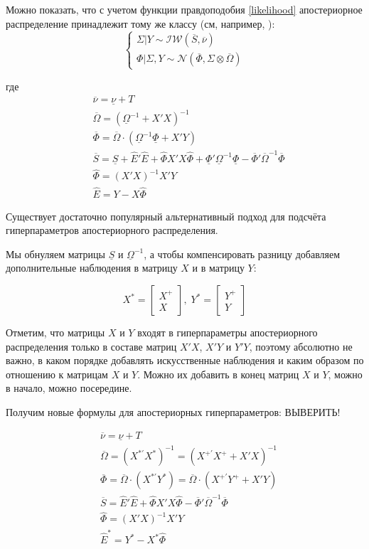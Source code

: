 \documentclass[11pt]{article} %
\newcommand{\cN}{\mathcal{N}}
\newcommand{\cIW}{\mathcal{IW}}
\newcommand{\prior}{\underline}
\newcommand{\post}{\overline}
\begin{document}
Можно показать, что с учетом функции правдоподобия \eqref{likelihood} апостериорное распределение принадлежит тому же классу (см, например, \cite{zellner_1996_introduction}):
\begin{equation}
\begin{cases}
\Sigma|Y \sim \cIW(\post S, \post \nu) \\
\Phi|\Sigma,Y\sim \cN (\post \Phi, \Sigma\otimes\post \Omega) 
\end{cases}
\end{equation}

где
\begin{align*}
&\post\nu =\prior \nu+T\\
&\post{\Omega}=(\prior \Omega^{-1}+X'X)^{-1}\\
&\post \Phi=\post{\Omega}\cdot (\prior \Omega^{-1}\prior \Phi+X'Y)\\
&\post S=\prior S +\hat E'\hat E+\hat \Phi X'X \hat \Phi +\prior \Phi'\prior\Omega^{-1}\prior \Phi-\post \Phi'\post\Omega^{-1}\post \Phi\\
&\hat\Phi=(X'X)^{-1}X'Y\\%
&\hat E=Y-X\hat\Phi
\end{align*}


Существует достаточно популярный альтернативный подход для подсчёта гиперпараметров апостериорного распределения.


Мы обнуляем матрицы  $\prior S$ и $\prior \Omega^{-1}$, а чтобы компенсировать разницу добавляем дополнительные наблюдения в матрицу $X$ и в матрицу $Y$: 

\[
X^*=\begin{bmatrix}
X^{+} \\
X 
\end{bmatrix}, \;
Y^*=\begin{bmatrix}
Y^{+} \\
Y 
\end{bmatrix}
\]

Отметим, что матрицы $X$ и $Y$ входят в гиперпараметры апостериорного распределения только в составе матриц $X'X$, $X'Y$ и $Y'Y$, поэтому абсолютно не важно, в каком порядке добавлять искусственные наблюдения и каким образом по отношению к матрицам $X$ и $Y$. Можно их добавить в конец матриц $X$ и $Y$, можно в начало, можно посередине.

Получим новые формулы для апостериорных гиперпараметров:
ВЫВЕРИТЬ!

\begin{align*}
&\post\nu =\prior \nu+T\\
&\post{\Omega}=(X^{*\prime}X^*)^{-1}=(X^{+\prime}X^+ + X'X)^{-1}\\
&\post \Phi=\post{\Omega}\cdot (X^{*\prime}Y^*)=\post{\Omega}\cdot (X^{+\prime}Y^++X'Y)\\
&\post S=\hat E'\hat E+\hat \Phi X'X \hat \Phi -\post \Phi'\post\Omega^{-1}\post \Phi\\
&\hat\Phi=(X'X)^{-1}X'Y\\%
&\hat E^*=Y^*-X^*\hat\Phi
\end{align*}
\end{document}
